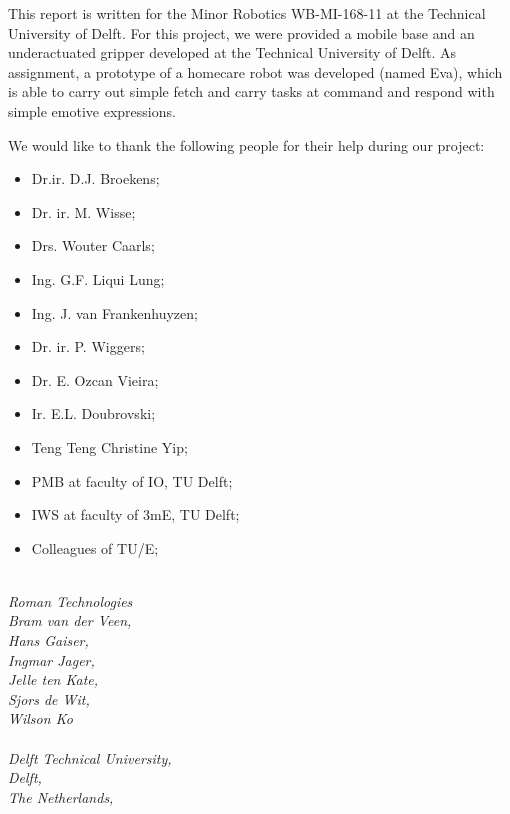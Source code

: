 \documentclass[project_eva.tex]{subfiles}
\begin{document}
\begin{minipage}[h]{2\linewidth}
This report is written for the Minor Robotics WB-MI-168-11 at the Technical University of Delft. For this project, we were provided a mobile base and an underactuated gripper developed at the Technical University of Delft. As assignment, a prototype of a homecare robot was developed (named Eva), which is able to carry out simple fetch and carry tasks at command and respond with simple emotive expressions.

We would like to thank the following people for their help during our project:
\\
\begin{itemize}
\item[] Dr.ir. D.J. Broekens;
\item[] Dr. ir. M. Wisse;
\item[] Drs. Wouter Caarls;
\item[] Ing. G.F. Liqui Lung; 
\item[] Ing. J. van Frankenhuyzen; 
\item[] Dr. ir. P. Wiggers; 
\item[] Dr. E. Ozcan Vieira;
\item[] Ir. E.L. Doubrovski; 
\item[] Teng Teng Christine Yip;
\item[] PMB at faculty of IO, TU Delft;
\item[] IWS at faculty of 3mE, TU Delft;
\item[] Colleagues of TU/E;
\end{itemize}
 

\textit{
\\
Roman Technologies\\
Bram van der Veen,\\
Hans Gaiser,\\
Ingmar Jager,\\
Jelle ten Kate,\\  
Sjors de Wit,\\
Wilson Ko\\\\
Delft Technical University,\\
Delft,\\
The Netherlands,\\
}

\end{minipage}
\end{document}
